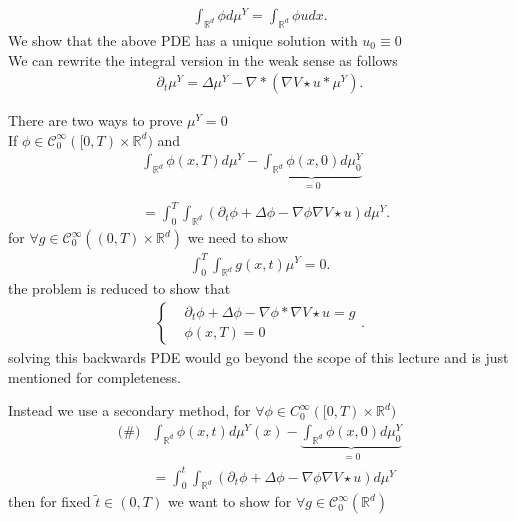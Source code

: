 \begin{align*}
  \int_{\mathbb{R}^{d} }\phi  d\mu ^{Y} = \int_{\mathbb{R}^{d} }  \phi  u dx
.\end{align*}
We show that the above PDE has a unique solution with $u_{0} \equiv 0$\\
We can rewrite the integral version in the weak sense as follows
\begin{align*}
  \partial_t \mu ^{Y} = \Delta \mu ^{Y}   - \nabla * (\nabla V \star  u * \mu ^{Y} )
.\end{align*}
\begin{remark}
There are two ways to prove $\mu^Y = 0$ \\
If $\phi  \in  \mathcal{C}_0^{\infty}([0,T)\times \mathbb{R}^{d} )$ and 
\begin{align*}
  &\int_{\mathbb{R}^{d} } \phi(x,T) d\mu ^{Y} - \underbrace{\int_{\mathbb{R}^{d} } \phi(x,0) d\mu^Y_0}_{=0}\\ \\
  &= \int_0^{T}\int_{\mathbb{R}^{d} }  (\partial_t \phi  + \Delta \phi  - \nabla \phi \nabla V \star u) d\mu^Y 
.\end{align*}
for $\forall  g \in  \mathcal{C}_0^{\infty}((0,T)\times \mathbb{R}^{d} ) $ we need to show 
\begin{align*}
  \int_0^{T} \int_{\mathbb{R}^{d}}   g(x,t) \mu^Y  = 0
.\end{align*}
the problem is reduced to  show that
\begin{align*}
  \begin{cases}
    &\partial_t \phi  + \Delta  \phi  - \nabla \phi  * \nabla V \star  u = g\\
    &\phi(x,T) = 0
  \end{cases}
.\end{align*}
solving this backwards PDE would go beyond the scope of this lecture and is just mentioned for completeness.\\[1ex]
\end{remark}
Instead we use a secondary method, for $\forall  \phi  \in  C_0^{\infty}([0,T)\times \mathbb{R}^{d} ) $
\begin{align*}
  \text{(\#)} &\int_{\mathbb{R}^{d} } \phi(x,t)  d\mu^Y(x) - \underbrace{\int_{\mathbb{R}^{d} } \phi(x,0) d\mu^Y_0}_{=0}\\
  &= \int_0^{t}\int_{\mathbb{R}^{d} }  (\partial_t \phi  + \Delta \phi  - \nabla \phi \nabla V \star u) d\mu^Y 
\end{align*}
then for fixed $\tilde{t} \in  (0,T)$ we want to show for $\forall  g \in  \mathcal{C}_0^{\infty}(\mathbb{R}^{d} ) $
